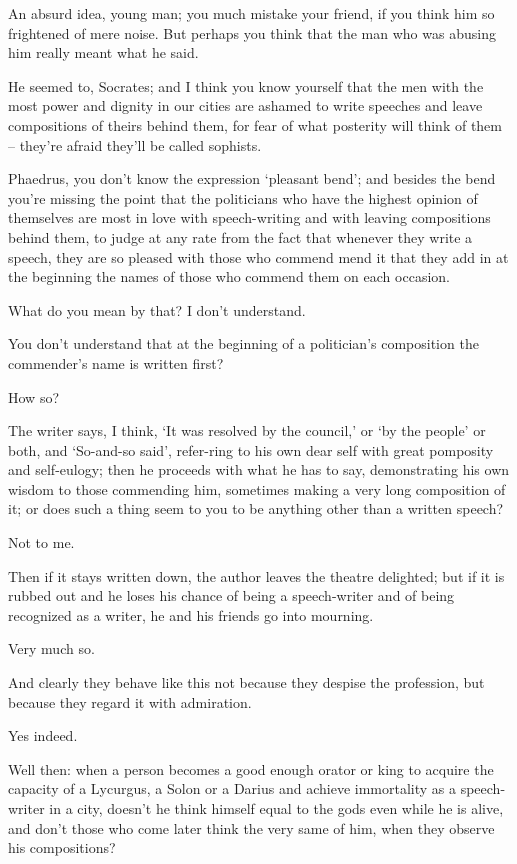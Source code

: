 An absurd idea, young man; you much mistake your 
friend, if you think him so frightened of mere noise. But perhaps you
think that the man who was abusing him really meant what he said.

He seemed to, Socrates; and I think you know  yourself
that the men with the most power and dignity in our cities are ashamed
to write speeches and leave compositions of theirs behind them, for fear
of what posterity will think of them -- they're afraid they'll be called
sophists.

Phaedrus, you don't know the expression ‘pleasant
bend'; and besides the
bend you're missing the point that the politicians who have the highest
opinion of themselves are most in love with speech-writing and with
leaving compositions behind them, to judge at any rate from the fact
that whenever they write a speech, they are so pleased with those who
commend  mend it that they add in at the beginning the names of
those who commend them on each occasion.

What do you mean by that? I don't understand.

You don't understand that at the beginning of a 
politician's composition the commender's name is written first?

How so?

The writer says, I think, ‘It was resolved by the 
council,' or ‘by the people' or both, and ‘So-and-so said', refer-ring
to his own dear self with great pomposity and self-eulogy; then he
proceeds with what he has to say, demonstrating his own wisdom to those
commending him, sometimes making a very long composition of it; or does
such a thing seem to you to be anything other than a written speech?

 Not to me.

Then if it stays written down, the
author leaves the
theatre delighted; but if it is rubbed out and he loses his chance of
being a speech-writer and of being recognized as a  writer, he
and his friends go into mourning.

Very much so.

And clearly they behave like this not because they despise the
profession, but because they regard it with admiration.

Yes indeed.

 Well then: when a person becomes a good enough
 orator or king to acquire the capacity of a Lycurgus, a Solon
or a Darius and achieve
immortality as a speech-writer in a city, doesn't he think himself equal
to the gods even while he is alive, and don't those who come later think
the very same of  him, when they observe his compositions?

